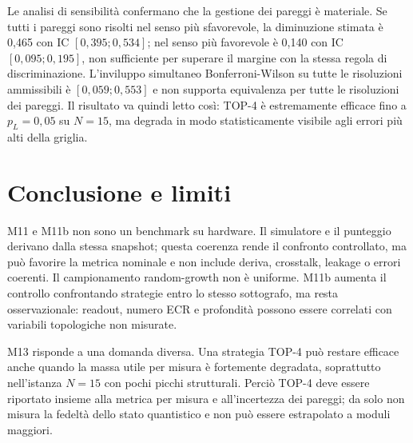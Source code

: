 \begin{onehalfspace}
Le analisi di sensibilit\`a confermano che la gestione dei pareggi \`e materiale. Se tutti i pareggi sono risolti nel senso pi\`u sfavorevole, la diminuzione stimata \`e 0,465 con IC $[0,395;0,534]$; nel senso pi\`u favorevole \`e 0,140 con IC $[0,095;0,195]$, non sufficiente per superare il margine con la stessa regola di discriminazione. L'inviluppo simultaneo Bonferroni-Wilson su tutte le risoluzioni ammissibili \`e $[0,059;0,553]$ e non supporta equivalenza per tutte le risoluzioni dei pareggi. Il risultato va quindi letto cos\`i: TOP-4 \`e estremamente efficace fino a $p_L=0,05$ su $N=15$, ma degrada in modo statisticamente visibile agli errori pi\`u alti della griglia.



\section{Conclusione e limiti}
\label{sec:app_comp_conclusione}

M11 e M11b non sono un benchmark su hardware. Il simulatore e il punteggio derivano dalla stessa snapshot; questa coerenza rende il confronto controllato, ma pu\`o favorire la metrica nominale e non include deriva, crosstalk, leakage o errori coerenti. Il campionamento random-growth non \`e uniforme. M11b aumenta il controllo confrontando strategie entro lo stesso sottografo, ma resta osservazionale: readout, numero ECR e profondit\`a possono essere correlati con variabili topologiche non misurate.

M13 risponde a una domanda diversa. Una strategia TOP-4 pu\`o restare efficace anche quando la massa utile per misura \`e fortemente degradata, soprattutto nell'istanza $N=15$ con pochi picchi strutturali. Perci\`o TOP-4 deve essere riportato insieme alla metrica per misura e all'incertezza dei pareggi; da solo non misura la fedelt\`a dello stato quantistico e non pu\`o essere estrapolato a moduli maggiori.

\end{onehalfspace}
